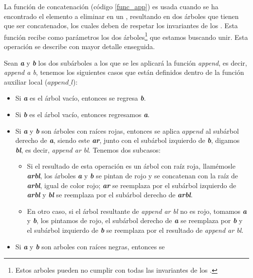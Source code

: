 La funci\'on de concatenación (c\'odigo \ref{func_app}) es usada cuando se ha encontrado el elemento a 
eliminar en un {\arn}, resultando en dos \'arboles que tienen que ser concatenados, los cuales deben 
de respetar los invariantes de los {\arns}. Esta funci\'on recibe como parámetros los dos 
\'arboles\footnote{Estos arboles pueden no cumplir con todas las invariantes de los {\arns}.} que 
estamos buscando unir. Esta operación se describe con mayor detalle enseguida.

Sean \textbf{\textit{a}} y \textbf{\textit{b}} los dos subárboles a los que se les aplicar\'a la 
funci\'on \emph{append}, es decir, \textit{append a b}, tenemos los siguientes casos que están definidos 
dentro de la funci\'on auxiliar local ($append\_l$):

\begin{itemize}
    \item Si \textbf{\textit{a}} es el \'arbol vacío, entonces se regresa \textbf{\textit{b}}.
    \item Si \textbf{\textit{b}} es el \'arbol vacío, entonces regresamos \textbf{\textit{a}}.
    \item Si \textbf{\textit{a}} y \textbf{\textit{b}} son \'arboles con raíces rojas, entonces se 
    aplica \hyperref[func_app]{$append$} al subárbol derecho de \textbf{\textit{a}}, siendo este \textbf{\textit{ar}}, 
    junto con el subárbol izquierdo de \textbf{\textit{b}}, digamos \textbf{\textit{bl}}, es decir, 
    \textit{append ar bl}. Tenemos dos subcasos:
    \begin{itemize}
      \item Si el resultado de esta operación es un árbol con raíz roja, llam\'emosle \textbf{\textit{arbl}},
      los \'arboles \textbf{\textit{a}} y \textbf{\textit{b}} se pintan de rojo y se concatenan con 
      la raíz de \textbf{\textit{arbl}}, igual de color rojo; \textbf{\textit{ar}} se reemplaza por 
      el subárbol izquierdo de \textbf{\textit{arbl}} y \textbf{\textit{bl}} se reemplaza por el
      subárbol derecho de \textbf{\textit{arbl}}.
      \item En otro caso, si el \'arbol resultante de \textit{append ar bl} no es rojo, tomamos 
      \textbf{\textit{a}} y \textbf{\textit{b}}, los pintamos de rojo, el subárbol derecho de
      \textbf{\textit{a}} se reemplaza por \textbf{\textit{b}} y el subárbol izquierdo de 
      \textbf{\textit{b}} se reemplaza por el resultado de \textit{append ar bl}.
    \end{itemize}
    \item Si \textbf{\textit{a}} y \textbf{\textit{b}} son arboles con raíces negras, entonces se 

\end{itemize}
